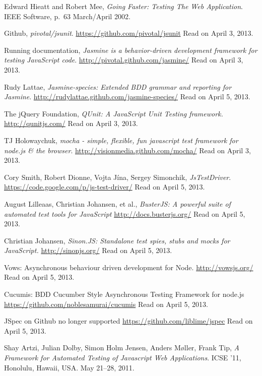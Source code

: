 \documentclass[11pt]{article}
\begin{document}
\begin{thebibliography}{9}

  Edward Hieatt and Robert Mee,
  \emph{Going Faster: Testing The Web Application}.
  IEEE Software, p.~63
  March/April 2002.

  Github,
  \emph{pivotal/jsunit}.
  \url{https://github.com/pivotal/jsunit}
  Read on April 3, 2013.

  Running documentation,
  \emph{Jasmine is a behavior-driven development framework for testing JavaScript code}.
  \url{http://pivotal.github.com/jasmine/}
  Read on April 3, 2013.

  Rudy Lattae,
  \emph{Jasmine-species: Extended BDD grammar and reporting for Jasmine}.
  \url{http://rudylattae.github.com/jasmine-species/}
  Read on April 5, 2013.

  The jQuery Foundation,
  \emph{QUnit: A JavaScript Unit Testing framework.}
  \url{http://qunitjs.com/}
  Read on April 3, 2013.

  TJ Holowaychuk,
  \emph{mocha - simple, flexible, fun javascript test framework for node.js \& the browser}.
  \url{http://visionmedia.github.com/mocha/}
  Read on April 3, 2013.

  Cory Smith, Robert Dionne, Vojta Jína, Sergey Simonchik,
  \emph{JsTestDriver}.
  \url{https://code.google.com/p/js-test-driver/}
  Read on April 5, 2013.

  August Lilleaas, Christian Johansen, et al.,
  \emph{BusterJS: A powerful suite of automated test tools for JavaScript}
  \url{http://docs.busterjs.org/}
  Read on April 5, 2013.

  Christian Johansen,
  \emph{Sinon.JS: Standalone test spies, stubs and mocks for JavaScript.}
  \url{http://sinonjs.org/}
  Read on April 5, 2013.

  Vows: Asynchronous behaviour driven development for Node.
  \url{http://vowsjs.org/}
  Read on April 5, 2013.

  Cucumis: BDD Cucumber Style Asynchronous Testing Framework for node.js
  \url{https://github.com/noblesamurai/cucumis}
  Read on April 5, 2013.

  JSpec on Github no longer supported
  \url{https://github.com/liblime/jspec}
  Read on April 5, 2013.

  Shay Artzi, Julian Dolby, Simon Holm Jensen, Anders Møller, Frank Tip,
  \emph{A Framework for Automated Testing of Javascript Web Applications}.
  ICSE ’11, Honolulu, Hawaii, USA.
  May 21–28, 2011.


\end{thebibliography}
\end{document}

